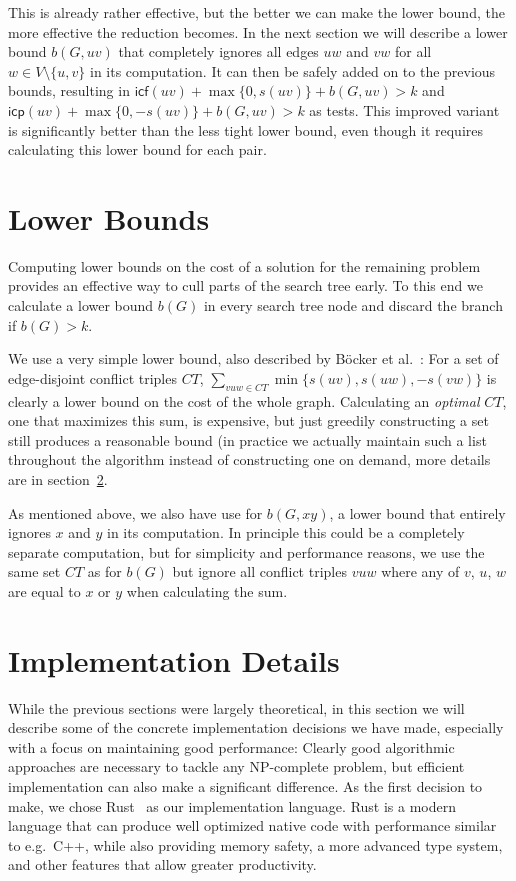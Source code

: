 \documentclass[12pt,oneside,english,parskip=full,headings=small]{scrbook}
\theoremstyle{definition}
\begin{document}
This is already rather effective, but the better we can make the lower bound, the more effective the
reduction becomes. In the next section we will describe a lower bound $b(G, uv)$ that completely
ignores all edges $uw$ and $vw$ for all $w \in V \setminus \{u, v\}$ in its computation. It can then
be safely added on to the previous bounds, resulting in $\mathsf{icf}(uv) + \max\{0, s(uv)\} + b(G,
uv) > k$ and $\mathsf{icp}(uv) + \max\{0, -s(uv)\} + b(G, uv) > k$ as tests. This improved variant
is significantly better than the less tight lower bound, even though it requires calculating this
lower bound for each pair.

\section{Lower Bounds}

Computing lower bounds on the cost of a solution for the remaining problem provides an effective way
to cull parts of the search tree early. To this end we calculate a lower bound $b(G)$ in every
search tree node and discard the branch if $b(G) > k$.

We use a very simple lower bound, also described by Böcker et al.~\cite{ExactAlgos}: For a set of
edge-disjoint conflict triples $CT$, $\sum_{vuw \in CT} \min\{s(uv), s(uw), -s(vw)\}$ is clearly a
lower bound on the cost of the whole graph. Calculating an \emph{optimal} $CT$, one that maximizes
this sum, is expensive, but just greedily constructing a set still produces a reasonable bound (in
practice we actually maintain such a list throughout the algorithm instead of constructing one on
demand, more details are in section~\ref{sec:impl details}.

As mentioned above, we also have use for $b(G, xy)$, a lower bound that entirely ignores $x$ and $y$
in its computation. In principle this could be a completely separate computation, but for simplicity
and performance reasons, we use the same set $CT$ as for $b(G)$ but ignore all conflict triples $vuw$
where any of $v$, $u$, $w$ are equal to $x$ or $y$ when calculating the sum.

\section{Implementation Details} \label {sec:impl details}

While the previous sections were largely theoretical, in this section we will describe some of the
concrete implementation decisions we have made, especially with a focus on maintaining good
performance: Clearly good algorithmic approaches are necessary to tackle any NP-complete problem,
but efficient implementation can also make a significant difference. As the first decision to make,
we chose Rust~\cite{Rust} as our implementation language. Rust is a modern language that can produce
well optimized native code with performance similar to e.g.\ C++, while also providing memory
safety, a more advanced type system, and other features that allow greater productivity. 
\end{document}
